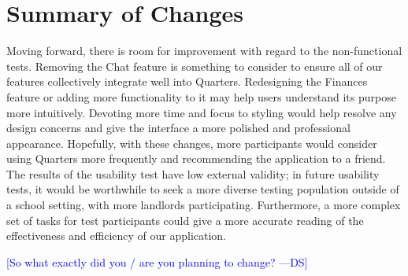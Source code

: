 \documentclass[12pt]{article}
\newcommand{\authornote}[3]{\textcolor{#1}{[#3 ---#2]}}
\newcommand{\authornote}[3]{}
\newcommand{\ds}[1]{\authornote{blue}{DS}{#1}}
\begin{document}
\section{Summary of Changes}
Moving forward, there is room for improvement with regard to the non-functional tests. Removing the Chat feature is something to consider to ensure all of our features collectively integrate well into Quarters. Redesigning the Finances feature or adding more functionality to it may help users understand its purpose more intuitively. Devoting more time and focus to styling would help resolve any design concerns and give the interface a more polished and professional appearance. Hopefully, with these changes, more participants would consider using Quarters more frequently and recommending the application to a friend. The results of the usability test have low external validity; in future usability tests, it would be worthwhile to seek a more diverse testing population outside of a school setting, with more landlords participating. Furthermore, a more complex set of tasks for test participants could give a more accurate reading of the effectiveness and efficiency of our application.

\ds{So what exactly did you / are you planning to change?}
\end{document}
